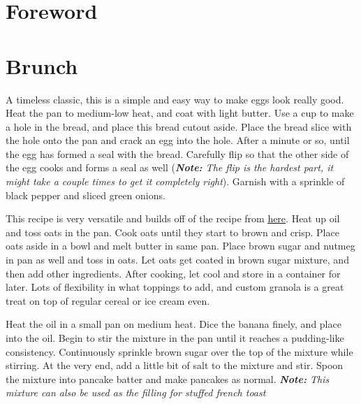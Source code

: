 \documentclass[oneside]{recipe}
\begin{document}
\tableofcontents
\chapter{Foreword}


\chapter{Brunch}

A timeless classic, this is a simple and easy way to make eggs look really good. Heat the pan to medium-low heat, and coat with light butter. Use a cup to make a hole in the bread, and place this bread cutout aside. Place the bread slice with the hole onto the pan and crack an egg into the hole. After a minute or so, until the egg has formed a seal with the bread. Carefully flip so that the other side of the egg cooks and forms a seal as well (\textit{\textbf{Note: } The flip is the hardest part, it might take a couple times to get it completely right}). Garnish with a sprinkle of black pepper and sliced green onions.


This recipe is very versatile and builds off of the recipe from \href{http://allrecipes.com/recipe/stovetop-granola/}{\underline{here}}. Heat up oil and toss oats in the pan. Cook oats until they start to brown and crisp. Place oats aside in a bowl and melt butter in same pan. Place brown sugar and nutmeg in pan as well and toss in oats. Let oats get coated in brown sugar mixture, and then add other ingredients. After cooking, let cool and store in a container for later. Lots of flexibility in what toppings to add, and custom granola is a great treat on top of regular cereal or ice cream even.


Heat the oil in a small pan on medium heat. Dice the banana finely, and place into the oil. Begin to stir the mixture in the pan until it reaches a pudding-like consistency. 
Continuously sprinkle brown sugar over the top of the mixture while stirring. At the very end, add a little bit of salt to the mixture and stir. Spoon the mixture into pancake batter and make pancakes as normal. \textit{\textbf{Note:} This mixture can also be used as the filling for stuffed french toast}
\end{document}
